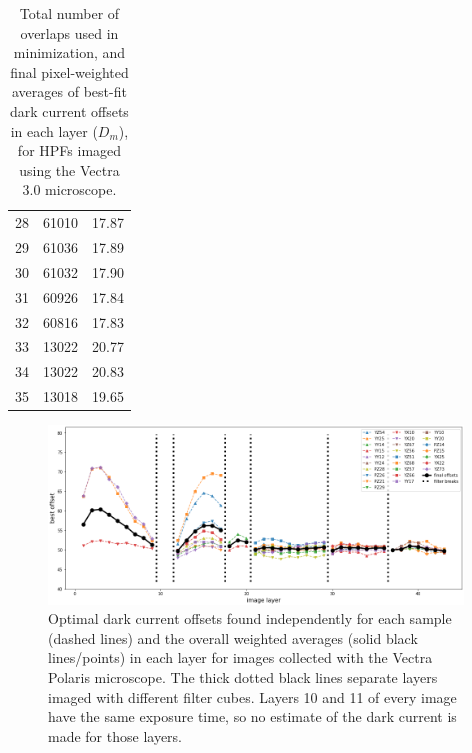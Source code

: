 \documentclass[letterpaper,11pt]{article}
\begin{document}
\begin{table}[!htb]
\begin{tabular}{c c c}
28              & 61010              & 17.87 \\
29              & 61036              & 17.89 \\
30              & 61032              & 17.90 \\
31              & 60926              & 17.84 \\
32              & 60816              & 17.83 \\
33              & 13022              & 20.77 \\
34              & 13022              & 20.83 \\
35              & 13018              & 19.65 \\
\hline
\end{tabular}
\caption{\footnotesize Total number of overlaps used in minimization, and final pixel-weighted averages of best-fit dark current offsets in each layer ($D_{m}$), for HPFs imaged using the Vectra 3.0 microscope.}
\label{tab:best_offsets_vectra}
\end{table}

\begin{figure}[!ht]
\centering
\includegraphics[width=0.98\textwidth]{images/results/dark_current_offsets_polaris}
\caption{\footnotesize Optimal dark current offsets found independently for each sample (dashed lines) and the overall weighted averages (solid black lines/points) in each layer for images collected with the Vectra Polaris microscope. The thick dotted black lines separate layers imaged with different filter cubes. Layers 10 and 11 of every image have the same exposure time, so no estimate of the dark current is made for those layers.}
\label{fig:dark_current_offsets_polaris}
\end{figure}
\end{document}
